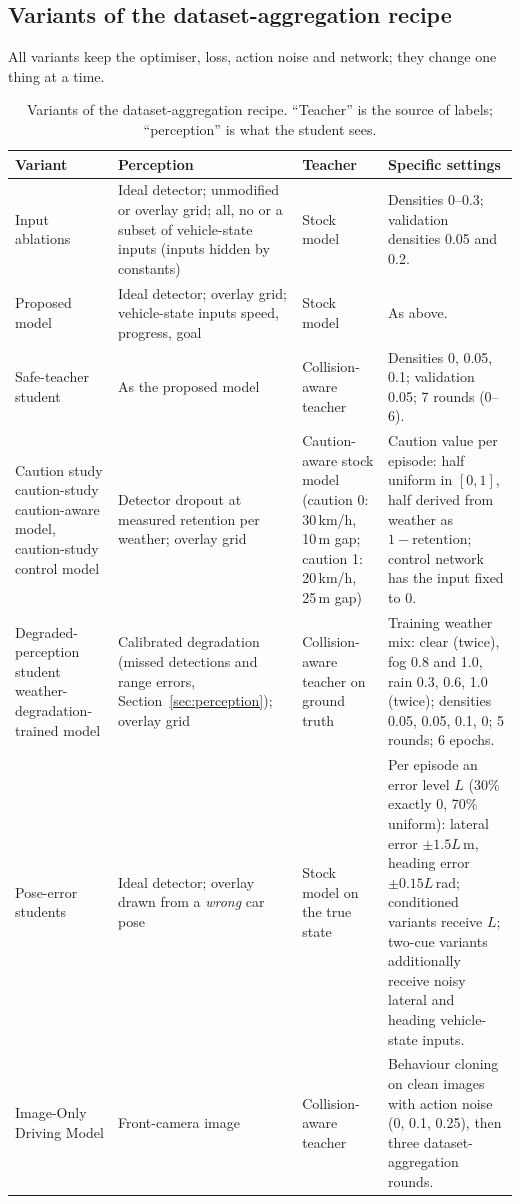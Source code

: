 

\subsection{Variants of the dataset-aggregation recipe}
All variants keep the optimiser, loss, action noise and network; they change one thing at a time.
\begin{table}[H]\centering\small
\caption{Variants of the dataset-aggregation recipe. ``Teacher'' is the source of labels; ``perception'' is what the student sees.}\label{tab:variants}
\begin{tabularx}{\textwidth}{@{}>{\raggedright\arraybackslash}p{3.7cm}>{\raggedright\arraybackslash}p{3.6cm}>{\raggedright\arraybackslash}p{2.8cm}X@{}}\toprule
Variant & Perception & Teacher & Specific settings\\\midrule
Input ablations & Ideal detector; unmodified or overlay grid; all, no or a subset of vehicle-state inputs (inputs hidden by constants) & Stock model & Densities 0--0.3; validation densities 0.05 and 0.2.\\
Proposed model & Ideal detector; overlay grid; vehicle-state inputs speed, progress, goal & Stock model & As above.\\
Safe-teacher student & As the proposed model & Collision-aware teacher & Densities 0, 0.05, 0.1; validation 0.05; 7 rounds (0--6).\\
Caution study caution-study caution-aware model, caution-study control model & Detector dropout at measured retention per weather; overlay grid & Caution-aware stock model (caution 0: 30\,km/h, 10\,m gap; caution 1: 20\,km/h, 25\,m gap) & Caution value per episode: half uniform in $[0,1]$, half derived from weather as $1-\text{retention}$; control network has the input fixed to 0.\\
Degraded-perception student weather-degradation-trained model & Calibrated degradation (missed detections and range errors, Section~\ref{sec:perception}); overlay grid & Collision-aware teacher on ground truth & Training weather mix: clear (twice), fog 0.8 and 1.0, rain 0.3, 0.6, 1.0 (twice); densities 0.05, 0.05, 0.1, 0; 5 rounds; 6 epochs.\\
Pose-error students & Ideal detector; overlay drawn from a \emph{wrong} car pose & Stock model on the true state & Per episode an error level $L$ ($30\%$ exactly 0, 70\% uniform): lateral error $\pm1.5L$\,m, heading error $\pm0.15L$\,rad; conditioned variants receive $L$; two-cue variants additionally receive noisy lateral and heading vehicle-state inputs.\\
Image-Only Driving Model & Front-camera image & Collision-aware teacher & Behaviour cloning on clean images with action noise (0, 0.1, 0.25), then three dataset-aggregation rounds.\\\bottomrule
\end{tabularx}
\end{table}

